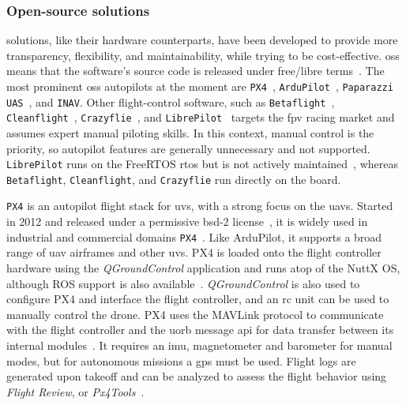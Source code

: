 \subsubsection{Open-source solutions}%
\label{sec:open-source-solut-sw}
 solutions, like their hardware counterparts, have been
developed to provide more transparency, flexibility, and
maintainability, while trying to be cost-effective. \gls{oss} means that the
software's source code is released under free/libre
terms~\cite{freeGNU}. The most prominent \gls{oss} autopilots at the moment are
\lstinline{PX4}~\cite{px4-github},
\lstinline{ArduPilot}~\cite{arduPilot-github},
\lstinline{Paparazzi UAS}~\cite{paparazzi-github}, and \lstinline{INAV}.
Other flight-control software, such as
\lstinline{Betaflight}~\cite{betaflight-github},
\lstinline{Cleanflight}~\cite{cleanflight-github},
\lstinline{Crazyflie}~\cite{crazyflie-home}, and \lstinline{LibrePilot}~\cite{librePilot-arch} targets the \gls{fpv} racing
market and assumes expert manual piloting skills. In this context, manual
control is the priority, so autopilot features are generally unnecessary and not
supported.
\lstinline{LibrePilot} runs on the FreeRTOS \gls{rtos} but is not actively
maintained~\cite{librePilot-github}, whereas \lstinline{Betaflight},
\lstinline{Cleanflight}, and \lstinline{Crazyflie} run directly on the board.

%
\lstinline{PX4} is an autopilot flight stack for \glspl{uv}, with a strong focus on the
\glspl{uav}. Started in 2012 and released under
a permissive \gls{bsd}-2 license~\cite{px4-github}, it is widely used in
industrial and commercial domains
\lstinline{PX4}~\cite{skynodeX-px4,spRacing-px4}. Like ArduPilot, it supports a
broad range of \gls{uav} airframes and other \glspl{uv}.
%
PX4 is loaded onto
the flight controller hardware using the \emph{QGroundControl}
application and runs atop of the NuttX OS, although ROS support is also
available~\cite{jargalsaikhan2022architectural}. \emph{QGroundControl} is also
used to configure PX4 and interface the flight controller, and an \gls{rc} unit
can be used to manually control the drone.
%
PX4 uses the MAVLink protocol to communicate with the flight controller and the
\gls{uorb} message \gls{api} for data transfer between its internal
modules~\cite{px4-sysArch,jargalsaikhan2022architectural}. It requires an
\gls{imu}, magnetometer and barometer for manual modes, but for autonomous
missions a \gls{gps} must be used. Flight logs are generated upon takeoff and
can be analyzed to assess the flight behavior using \emph{Flight Review}, or
\emph{Px4Tools}~\cite{glossner2021overview}. 

